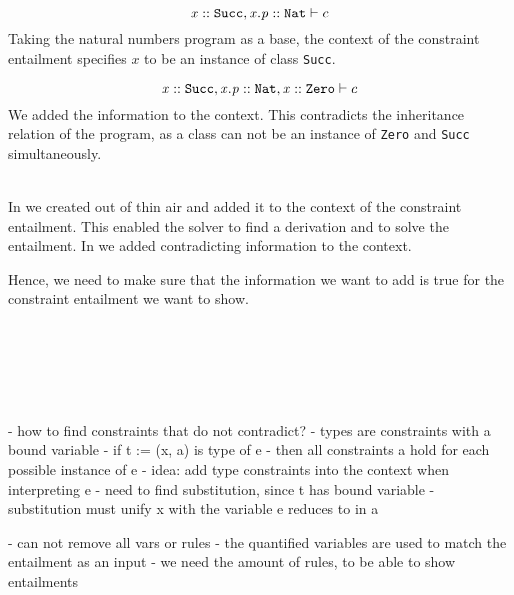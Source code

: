 \begin{example}
\label{ex:enrich-context-contra}\quad\\
\[  \mathit{x} :: \mathit{\texttt{Succ}}, \mathit{x.p} :: \mathit{\texttt{Nat}}  \vdash c \]
Taking the natural numbers program as a base,
the context of the constraint entailment specifies $x$ to be
an instance of class \texttt{Succ}.
        
\[  \mathit{x} :: \mathit{\texttt{Succ}}, \mathit{x.p} :: \mathit{\texttt{Nat}}, \mathit{x} :: \mathit{\texttt{Zero}}  \vdash c \]
We added the information  to the context.
This contradicts the inheritance relation of the program,
as a class can not be an instance of \texttt{Zero} and \texttt{Succ} simultaneously.
\end{example}
\quad\\
%
In 
we created  out of thin air
and added it to the context of the constraint entailment.
This enabled the solver to find a derivation and to solve
the entailment.
In 
we added contradicting information to the context.

Hence, we need to make sure that the information
we want to add is true for the constraint entailment
we want to show.


\quad\\\\\\\\\\
- how to find constraints that do not contradict?
- types are constraints with a bound variable
- if t := (x, a) is type of e
  - then all constraints a hold for each possible instance of e
- idea: add type constraints into the context when interpreting e
- need to find substitution, since t has bound variable
  - substitution must unify x with the variable e reduces to in a

- can not remove all vars or rules
- the quantified variables are used to match the entailment as an input
- we need the amount of rules, to be able to show entailments

